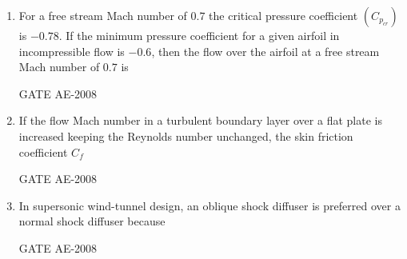 \documentclass[journal,12pt,onecolumn]{IEEEtran}
\theoremstyle{remark}
\begin{document}
\begin{enumerate}
    \quad

\item For a free stream Mach number of $0.7$ the critical pressure coefficient $(C_{p_{cr}})$ is $-0.78$. If the minimum pressure coefficient for a given airfoil in incompressible flow is $-0.6$, then the flow over the airfoil at a free stream Mach number of $0.7$ is  \\
\begin{enumerate}
\end{enumerate}
  \hfill{GATE AE-2008}

    \quad

\item If the flow Mach number in a turbulent boundary layer over a flat plate is increased keeping the Reynolds number unchanged, the skin friction coefficient $C_f$  \\
\begin{enumerate}
\end{enumerate}
 \hfill{GATE AE-2008}

    \quad

\item In supersonic wind-tunnel design, an oblique shock diffuser is preferred over a normal shock diffuser because  \\
\begin{enumerate}
\end{enumerate}
 \hfill{GATE AE-2008}


\end{enumerate}
\end{document}
